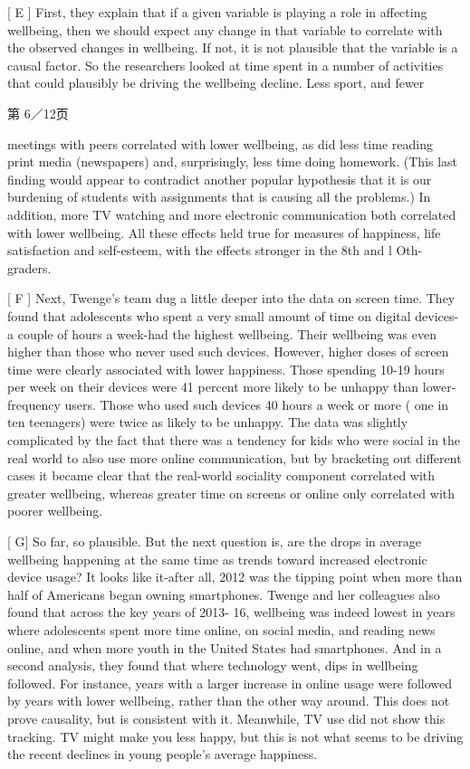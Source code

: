 \documentclass[UTF8,11pt]{ctexart}
\begin{document}
[ E ] First, they explain that if a given variable is playing a role in affecting wellbeing, then we should expect any change in that variable to correlate with the observed changes in wellbeing. If not, it is not plausible that the variable is a causal factor. So the researchers looked at time spent in a number of activities that could plausibly be driving the wellbeing decline. Less sport, and fewer


第 6／12页


meetings with peers correlated with lower wellbeing, as did less time reading print media (newspapers) and, surprisingly, less time doing homework. (This last finding would appear to contradict another popular hypothesis that it is our burdening of students with assignments that is causing all the problems.) In addition, more TV watching and more electronic communication both correlated with lower wellbeing. All these effects held true for measures of happiness, life satisfaction and self-esteem, with the effects stronger in the 8th and l Oth-graders.


[ F ] Next, Twenge's team dug a little deeper into the data on screen time. They found that adolescents who spent a very small amount of time on digital devices-a couple of hours a week-had the highest wellbeing. Their wellbeing was even higher than those who never used such devices. However, higher doses of screen time were clearly associated with lower happiness. Those spending 10-19 hours per week on their devices were 41 percent more likely to be unhappy than lower-frequency users. Those who used such devices 40 hours a week or more ( one in ten teenagers) were twice as likely to be unhappy. The data was slightly complicated by the fact that there was a tendency for kids who were social in the real world to also use more online communication, but by bracketing out different cases it became clear that the real-world sociality component correlated with greater wellbeing, whereas greater time on screens or online only correlated with poorer wellbeing.


[ G] So far, so plausible. But the next question is, are the drops in average wellbeing happening at the same time as trends toward increased electronic device usage? It looks like it-after all, 2012 was the tipping point when more than half of Americans began owning smartphones. Twenge and her colleagues also found that across the key years of 2013- 16, wellbeing was indeed lowest in years where adolescents spent more time online, on social media, and reading news online, and when more youth in the United States had smartphones. And in a second analysis, they found that where technology went, dips in wellbeing followed. For instance, years with a larger increase in online usage were followed by years with lower wellbeing, rather than the other way around. This does not prove causality, but is consistent with it. Meanwhile, TV use did not show this tracking. TV might make you less happy, but this is not what seems to be driving the recent declines in young people's average happiness.
\end{document}
